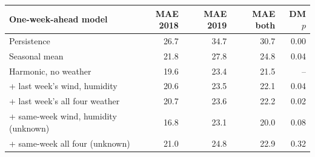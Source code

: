 \begin{tabular}{|l|r|r|r|r|}
\hline
\textbf{One-week-ahead model} & \textbf{MAE 2018} & \textbf{MAE 2019} & \textbf{MAE both} & \textbf{DM $p$} \\\hline
Persistence & 26.7 & 34.7 & 30.7 & 0.00 \\\hline
Seasonal mean & 21.8 & 27.8 & 24.8 & 0.04 \\\hline
Harmonic, no weather & 19.6 & 23.4 & 21.5 & -- \\\hline
+ last week's wind, humidity & 20.6 & 23.5 & 22.1 & 0.04 \\\hline
+ last week's all four weather & 20.7 & 23.6 & 22.2 & 0.02 \\\hline
+ same-week wind, humidity (unknown) & 16.8 & 23.1 & 20.0 & 0.08 \\\hline
+ same-week all four (unknown) & 21.0 & 24.8 & 22.9 & 0.32 \\\hline
\end{tabular}
